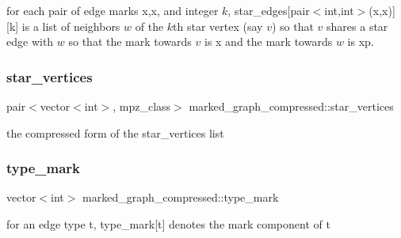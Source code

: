 for each pair of edge marks x,x\textquotesingle{}, and integer $k$, star\+\_\+edges\mbox{[}pair$<$int,int$>$(x,x\textquotesingle{})\mbox{]}\mbox{[}k\mbox{]} is a list of neighbors $w$ of the $k$th star vertex (say $v$) so that $v$ shares a star edge with $w$ so that the mark towards $v$ is x and the mark towards $w$ is xp. 

\mbox{\label{classmarked__graph__compressed_a7a4ced4586e2e353f9076bd447df5208}} 
\subsubsection{\texorpdfstring{star\+\_\+vertices}{star\_vertices}}
{\footnotesize\ttfamily pair$<$vector$<$int$>$, mpz\+\_\+class$>$ marked\+\_\+graph\+\_\+compressed\+::star\+\_\+vertices}



the compressed form of the star\+\_\+vertices list 

\mbox{\label{classmarked__graph__compressed_a86b00223525703e973415cbc9c94da68}} 
\subsubsection{\texorpdfstring{type\+\_\+mark}{type\_mark}}
{\footnotesize\ttfamily vector$<$int$>$ marked\+\_\+graph\+\_\+compressed\+::type\+\_\+mark}



for an edge type t, type\+\_\+mark\mbox{[}t\mbox{]} denotes the mark component of t 

\mbox{\label{classmarked__graph__compressed_af2e3e55223d436628a02758dfae88493}} 
